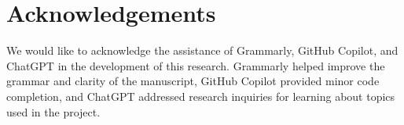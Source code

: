 \section{Acknowledgements}\label{sec:acknowledgements}

We would like to acknowledge the assistance of Grammarly, GitHub Copilot, and ChatGPT in the development of this research. Grammarly helped improve the grammar and clarity of the manuscript, GitHub Copilot provided minor code completion, and ChatGPT addressed research inquiries for learning about topics used in the project.